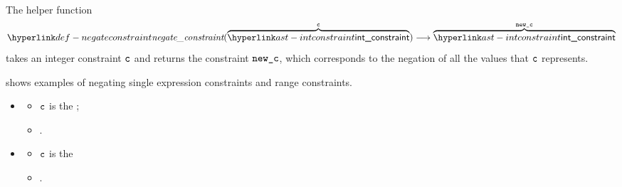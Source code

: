 \begin{mathpar}
\end{mathpar}

\begin{mathpar}
\end{mathpar}

\begin{mathpar}
\end{mathpar}

\hypertarget{def-negateconstraint}{}
The helper function
\[
  \negateconstraint(\overname{\intconstraint}{\vc}) \aslto \overname{\intconstraint}{\newc}
\]
takes an integer constraint $\vc$ and returns the constraint $\newc$,
which corresponds to the negation of all the values that $\vc$ represents.

 shows examples of negating single expression
constraints and range constraints.

\ProseParagraph
\OneApplies
\begin{itemize}
  \item {}
  \begin{itemize}
    \item $\vc$ is the \Proseexactconstraint{$\ve$};
    \item {}.
  \end{itemize}

  \item {}
  \begin{itemize}
    \item $\vc$ is the \Proserangeconstraint{$\vstart$}{$\vend$}
    \item {}.
  \end{itemize}
\end{itemize}

